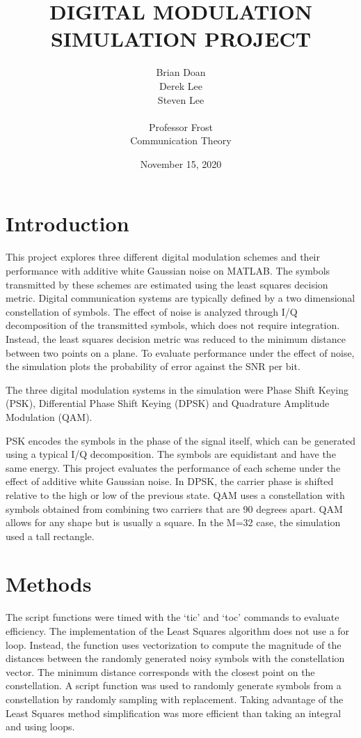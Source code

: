 \documentclass[12pt]{report}
\title{ \normalsize \LARGE {\uppercase{Digital Modulation Simulation Project}}}
\author{
    Brian Doan \\ Derek Lee \\ Steven Lee \\\\ 
    Professor Frost \\ Communication Theory 
}
\date{November 15, 2020}
\newcommand\tab[1][1cm]{\hspace*{#1}}               %
\begin{document}
\maketitle
\tableofcontents
\newpage

\section{Introduction}

\tab This project explores three different digital modulation schemes and their performance with additive white Gaussian noise on MATLAB. The symbols transmitted by these schemes are estimated using the least squares decision metric. Digital communication systems are typically defined by a two dimensional constellation of symbols. The effect of noise is analyzed through I/Q decomposition of the transmitted symbols, which does not require integration. Instead, the least squares decision metric was reduced to the minimum distance between two points on a plane. To evaluate performance under the effect of noise, the simulation plots the probability of error against the SNR per bit.

\quad The three digital modulation systems in the simulation were Phase Shift Keying (PSK), Differential Phase Shift Keying (DPSK) and Quadrature Amplitude Modulation (QAM). 

\quad PSK encodes the symbols in the phase of the signal itself, which can be generated using a typical I/Q decomposition. The symbols are equidistant and have the same energy. This project evaluates the performance of each scheme under the effect of additive white Gaussian noise. In DPSK, the carrier phase is shifted relative to the high or low of the previous state. QAM uses a constellation with symbols obtained from combining two carriers that are 90 degrees apart. QAM allows for any shape but is usually a square. In the M=32 case, the simulation used a tall rectangle. 

\newpage

\section{Methods}


\tab The script functions were timed with the `tic' and `toc' commands to evaluate efficiency. The implementation of the Least Squares algorithm does not use a for loop. Instead, the function uses vectorization to compute the magnitude of the distances between the randomly generated noisy symbols with the constellation vector. The minimum distance corresponds with the closest point on the constellation. A script function was used to randomly generate symbols from a constellation by randomly sampling with replacement. Taking advantage of the Least Squares method simplification was more efficient than taking an integral and using loops.
\end{document}

